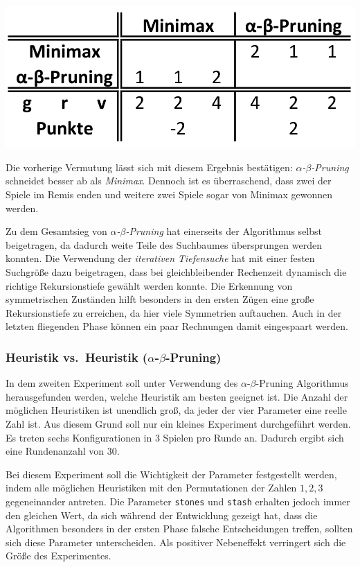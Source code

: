 \documentclass[11pt]{article}
\begin{document}
    \includegraphics{../images/nmm-mm-vs-ab.png}

Die vorherige Vermutung lässt sich mit diesem Ergebnis bestätigen:
\emph{$\alpha$-$\beta$-Pruning} schneidet besser ab als \emph{Minimax}. Dennoch ist
es überraschend, dass zwei der Spiele im Remis enden und weitere zwei
Spiele sogar von Minimax gewonnen werden.

Zu dem Gesamtsieg von \emph{$\alpha$-$\beta$-Pruning} hat einerseits der Algorithmus
selbst beigetragen, da dadurch weite Teile des Suchbaumes übersprungen
werden konnten. Die Verwendung der \emph{iterativen Tiefensuche} hat mit
einer festen Suchgröße dazu beigetragen, dass bei gleichbleibender
Rechenzeit dynamisch die richtige Rekursionstiefe gewählt werden konnte.
Die Erkennung von symmetrischen Zuständen hilft besonders in den ersten
Zügen eine große Rekursionstiefe zu erreichen, da hier viele Symmetrien
auftauchen. Auch in der letzten fliegenden Phase können ein paar
Rechnungen damit eingespaart werden.

    \hypertarget{heuristik-vs.heuristik-ux3b1-ux3b2-pruning}{%
\subsubsection{Heuristik vs.~Heuristik
($\alpha$-$\beta$-Pruning)}\label{heuristik-vs.heuristik-ux3b1-ux3b2-pruning}}

In dem zweiten Experiment soll unter Verwendung des $\alpha$-$\beta$-Pruning
Algorithmus herausgefunden werden, welche Heuristik am besten geeignet
ist. Die Anzahl der möglichen Heuristiken ist unendlich groß, da jeder
der vier Parameter eine reelle Zahl ist. Aus diesem Grund soll nur ein
kleines Experiment durchgeführt werden. Es treten sechs Konfigurationen
in 3 Spielen pro Runde an. Dadurch ergibt sich eine Rundenanzahl von 30.

Bei diesem Experiment soll die Wichtigkeit der Parameter festgestellt
werden, indem alle möglichen Heuristiken mit den Permutationen der
Zahlen \(1, 2, 3\) gegeneinander antreten. Die Parameter \texttt{stones}
und \texttt{stash} erhalten jedoch immer den gleichen Wert, da sich
während der Entwicklung gezeigt hat, dass die Algorithmen besonders in
der ersten Phase falsche Entscheidungen treffen, sollten sich diese
Parameter unterscheiden. Als positiver Nebeneffekt verringert sich die
Größe des Experimentes.
\end{document}
